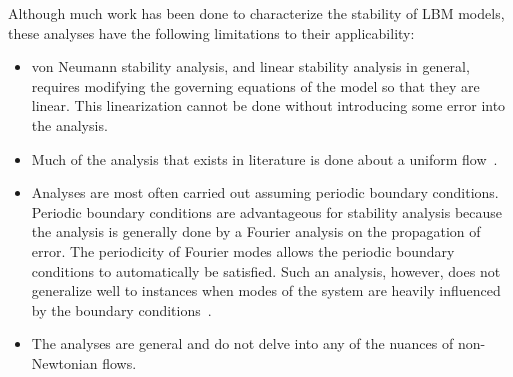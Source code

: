 \documentclass[pdftex,ms]{pittetd}
\begin{document}
Although much work has been done to characterize the stability of LBM models, these analyses have the following limitations to their applicability:
\begin{itemize}
	\item von Neumann stability analysis, and linear stability analysis in general, requires modifying the governing equations of the model so that they are linear. 
	This linearization cannot be done without introducing some error into the analysis. %
	\item Much of the analysis that exists in literature is done about a uniform flow~\cite{worthing1997stability,niu2004investigation}. %
	\item Analyses are most often carried out assuming periodic boundary conditions.
	Periodic boundary conditions are advantageous for stability analysis because the analysis is generally done by a Fourier analysis on the propagation of error.
	The periodicity of Fourier modes allows the periodic boundary conditions to automatically be satisfied.
	Such an analysis, however, does not generalize well to instances when modes of the system are heavily influenced by the boundary conditions~\cite{worthing1997stability}.
	\item The analyses are general and do not delve into any of the nuances of non-Newtonian flows.
\end{itemize}
\end{document}
